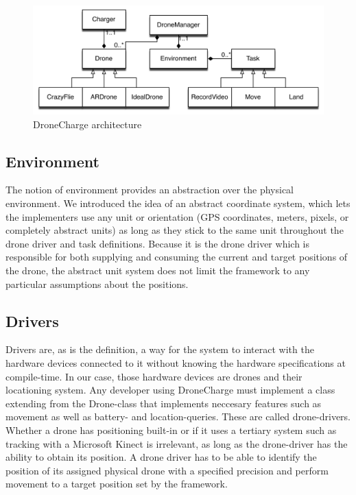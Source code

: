 \begin{figure}[h]
\centering
\includegraphics[width=\columnwidth]{images/dronechargearchitecture.png}
\caption{DroneCharge architecture}
\label{fig:architecturefig}
\end{figure}

\subsection{Environment}
The notion of environment provides an abstraction over the physical environment. We introduced the idea of an abstract coordinate system, which lets the implementers use any unit or orientation (GPS coordinates, meters, pixels, or completely abstract units) as long as they stick to the same unit throughout the drone driver and task definitions. Because it is the drone driver which is responsible for both supplying and consuming the current and target positions of the drone, the abstract unit system does not limit the framework to any particular assumptions about the positions.

\subsection{Drivers}
Drivers are, as is the definition, a way for the system to interact with the hardware devices connected to it without knowing the hardware specifications at compile-time. In our case, those hardware devices are drones and their locationing system. Any developer using DroneCharge must implement a class extending from the Drone-class that implements neccesary features such as movement as well as battery- and location-queries. These are called drone-drivers. Whether a drone has positioning built-in or if it uses a tertiary system such as tracking with a Microsoft Kinect is irrelevant, as long as the drone-driver has the ability to obtain its position. A drone driver has to be able to identify the position of its assigned physical drone with a specified precision and perform movement to a target position set by the framework.

